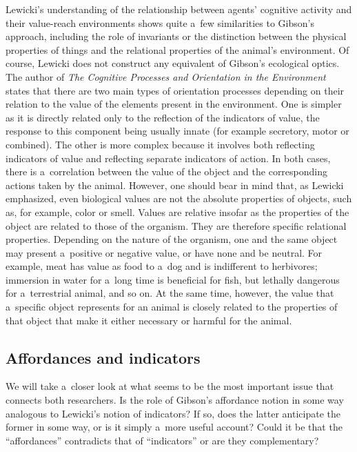 \documentclass[%
manuscript=article,
year=2024,
volume=77,
doi=00000.000,
]{zfn}
\begin{document}
Lewicki's understanding of the relationship between agents' cognitive activity and their value-reach environments shows quite a~few similarities to Gibson's approach, including the role of invariants or the distinction between the physical properties of things and the relational properties of the animal's environment. Of course, Lewicki does not construct any equivalent of Gibson's ecological optics. The author of \textit{The Cognitive Processes and Orientation in the Environment} states that there are two main types of orientation processes depending on their relation to the value of the elements present in the environment. One is simpler as it is directly related only to the reflection of the indicators of value, the response to this component being usually innate (for example secretory, motor or combined). The other is more complex because it involves both reflecting indicators of value and reflecting separate indicators of action. In both cases, there is a~correlation between the value of the object and the corresponding actions taken by the animal. However, one should bear in mind that, as Lewicki emphasized, even biological values are not the absolute properties of objects, such as, for example, color or smell. Values are relative insofar as the properties of the object are related to those of the organism. They are therefore specific relational properties. Depending on the nature of the organism, one and the same object may present a~positive or negative value, or have none and be neutral. For example, meat has value as food to a~dog and is indifferent to herbivores; immersion in water for a~long time is beneficial for fish, but lethally dangerous for a~terrestrial animal, and so on. At the same time, however, the value that a~specific object represents for an animal is closely related to the properties of that object that make it either necessary or harmful for the animal.



\subsection{Affordances and indicators}



We will take a~closer look at what seems to be the most important issue that connects both researchers. Is the role of Gibson's affordance notion in some way analogous to Lewicki's notion of indicators? If so, does the latter anticipate the former in some way, or is it simply a~more useful account? Could it be that the ``affordances'' contradicts that of ``indicators'' or are they complementary?
\end{document}
